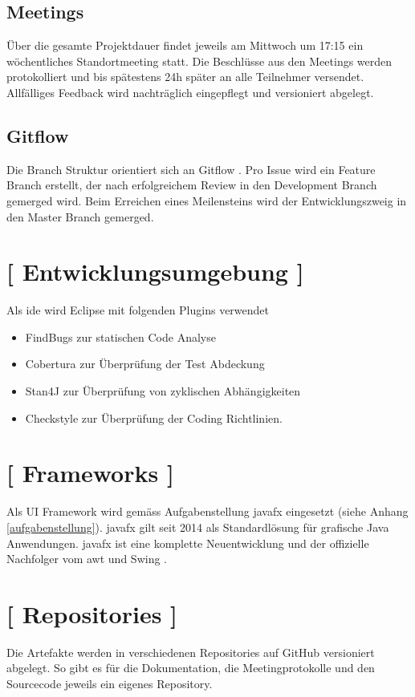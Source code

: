 \documentclass[11pt,a4paper,english,oneside]{book}
\numberwithin{equation}{chapter}
\begin{document}
	\subsection{Meetings}
	Über die gesamte Projektdauer findet jeweils am Mittwoch um 17:15 ein wöchentliches Standortmeeting statt. Die Beschlüsse aus den Meetings werden protokolliert und bis spätestens 24h später an alle Teilnehmer versendet. Allfälliges Feedback wird nachträglich eingepflegt und versioniert abgelegt.
	

	
	\subsection{Gitflow}
	Die Branch Struktur orientiert sich an Gitflow \cite{gitflow}. Pro Issue wird ein Feature Branch erstellt, der nach erfolgreichem Review in den Development Branch gemerged wird. Beim Erreichen eines Meilensteins wird der Entwicklungszweig in den Master Branch gemerged.
	
	\section{ [ Entwicklungsumgebung ] }
	Als \gls{ide} wird Eclipse mit folgenden Plugins verwendet
	\begin{itemize}
		\item FindBugs \cite{findbugs} zur statischen Code Analyse
		\item Cobertura \cite{cobertura} zur Überprüfung der Test Abdeckung
		\item Stan4J \cite{stan4j} zur Überprüfung von zyklischen Abhängigkeiten
		\item Checkstyle \cite{checkstyle} zur Überprüfung der Coding Richtlinien.
	\end{itemize}

	\section{ [ Frameworks ] }
	Als UI Framework wird gemäss Aufgabenstellung \gls{javafx} eingesetzt (siehe Anhang \ref{aufgabenstellung}). \gls{javafx} gilt seit 2014 als Standardlösung für grafische Java Anwendungen. \gls{javafx} ist eine komplette Neuentwicklung und der offizielle Nachfolger vom \gls{awt} \cite{awt} und Swing \cite{swing}. 

	\section{ [ Repositories ] }
	Die Artefakte werden in verschiedenen Repositories auf GitHub versioniert abgelegt. So gibt es für die Dokumentation, die Meetingprotokolle und den Sourcecode jeweils ein eigenes Repository.
\end{document}
